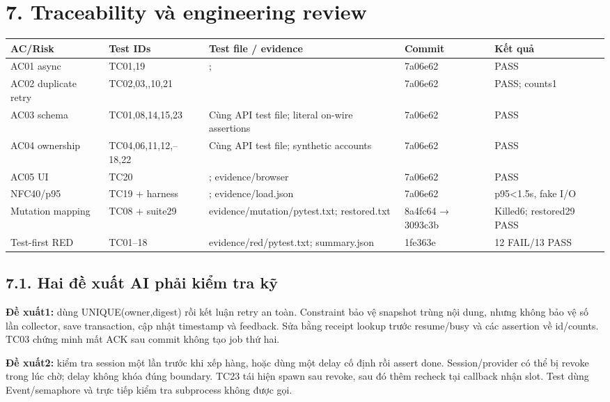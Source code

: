 \documentclass[10pt,a4paper]{article}
\newcommand{\Green}{7a06e62}
\begin{document}
\section*{7. Traceability và engineering review}
\par\begingroup\small
\begin{tabularx}{\linewidth}{@{}p{19mm}p{23mm}Y p{18mm}p{22mm}@{}}
\toprule{}\textbf{AC/Risk} & \textbf{Test IDs} & \textbf{Test file / evidence} & \textbf{Commit} & \textbf{Kết quả}\\\midrule
AC01 async & TC01,19 & ;  & \Green & PASS\\
AC02 duplicate retry & TC02,03,,10,21 &  & \Green & PASS; counts1\\
AC03 schema & TC01,08,14,15,23 & Cùng API test file; literal on-wire assertions & \Green & PASS\\
AC04 ownership & TC04,06,11,12,–18,22 & Cùng API test file; synthetic accounts & \Green & PASS\\
AC05 UI & TC20 & ; evidence/browser & \Green & PASS\\
NFC40/p95 & TC19 + harness & ; evidence/load.json & \Green & p95<1.5s, fake I/O\\
Mutation mapping & TC08 + suite29 & evidence/mutation/pytest.txt; restored.txt & 8a4fc64 → 3093c3b & Killed6; restored29 PASS\\
Test-first RED & TC01–18 & evidence/red/pytest.txt; summary.json & 1fe363e & 12 FAIL/13 PASS\\
\bottomrule
\end{tabularx}\endgroup\par

\subsection*{7.1. Hai đề xuất AI phải kiểm tra kỹ}
\textbf{Đề xuất1:} dùng UNIQUE(owner,digest) rồi kết luận retry an toàn. Constraint bảo vệ snapshot trùng nội dung,
nhưng không bảo vệ số lần collector, save transaction, cập nhật timestamp và feedback. Sửa bằng receipt lookup
trước resume/busy và các assertion về id/counts. TC03 chứng minh mất ACK sau commit không tạo job thứ hai.

\textbf{Đề xuất2:} kiểm tra session một lần trước khi xếp hàng, hoặc dùng một delay cố định rồi assert done.
Session/provider có thể bị revoke trong lúc chờ; delay không khóa đúng boundary.
TC23 tái hiện spawn sau revoke, sau đó thêm recheck tại callback nhận slot.
Test dùng Event/semaphore và trực tiếp kiểm tra subprocess không được gọi.
\end{document}
